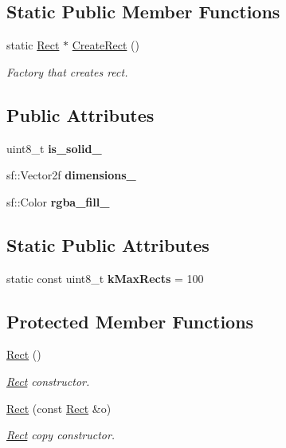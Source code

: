 \subsection*{Static Public Member Functions}
\begin{DoxyCompactItemize}
\item 
static \hyperlink{class_rect}{Rect} $\ast$ \hyperlink{class_rect_ac9283327c926d453d0cd5a49ded8d150}{Create\+Rect} ()
\begin{DoxyCompactList}\small\item\em Factory that creates rect. \end{DoxyCompactList}\end{DoxyCompactItemize}
\subsection*{Public Attributes}
\begin{DoxyCompactItemize}
\item 
\mbox{\label{class_rect_a898ebf0731c53c824582d4b1930b9e90}} 
uint8\+\_\+t {\bfseries is\+\_\+solid\+\_\+}
\item 
\mbox{\label{class_rect_abb92a0e14f750712887e2061866a52bd}} 
sf\+::\+Vector2f {\bfseries dimensions\+\_\+}
\item 
\mbox{\label{class_rect_a6af011eb6f16dabee8eff47e0772260e}} 
sf\+::\+Color {\bfseries rgba\+\_\+fill\+\_\+}
\end{DoxyCompactItemize}
\subsection*{Static Public Attributes}
\begin{DoxyCompactItemize}
\item 
\mbox{\label{class_rect_a18981822ae235d9ed80b6dd9ba257fcc}} 
static const uint8\+\_\+t {\bfseries k\+Max\+Rects} = 100
\end{DoxyCompactItemize}
\subsection*{Protected Member Functions}
\begin{DoxyCompactItemize}
\item 
\hyperlink{class_rect_a911e531b86de33734dd7de3456722115}{Rect} ()
\begin{DoxyCompactList}\small\item\em \hyperlink{class_rect}{Rect} constructor. \end{DoxyCompactList}\item 
\hyperlink{class_rect_af7bc3c8e555de1401faff38c7e348a24}{Rect} (const \hyperlink{class_rect}{Rect} \&o)
\begin{DoxyCompactList}\small\item\em \hyperlink{class_rect}{Rect} copy constructor. \end{DoxyCompactList}\end{DoxyCompactItemize}
